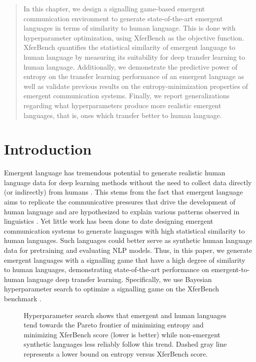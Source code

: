 \begin{abstract}
In this chapter, we design a signalling game-based emergent communication environment to generate state-of-the-art emergent languages in terms of similarity to human language.
This is done with hyperparameter optimization, using XferBench as the objective function.
XferBench quantifies the statistical similarity of emergent language to human language by measuring its suitability for deep transfer learning to human language.
Additionally, we demonstrate the predictive power of entropy on the transfer learning performance of an emergent language as well as validate previous results on the entropy-minimization properties of emergent communication systems.
Finally, we report generalizations regarding what hyperparameters produce more realistic emergent languages, that is, ones which transfer better to human language.
\end{abstract}

\section{Introduction}


Emergent language has tremendous potential to generate realistic human language data for deep learning methods without the need to collect data directly (or indirectly) from humans \citep{boldt2024review}.
This stems from the fact that emergent language aims to replicate the communicative pressures that drive the development of human language and are hypothesized to explain various patterns observed in linguistics \citep{sep-linguistics}.
Yet little work has been done to date designing emergent communication systems to generate languages with high statistical similarity to human languages.
Such languages could better serve as synthetic human language data for pretraining and evaluating NLP models.
Thus, in this paper, we generate emergent languages with a signalling game that have a high degree of similarity to human languages, demonstrating state-of-the-art performance on emergent-to-human language deep transfer learning.
Specifically, we use Bayesian hyperparameter search to optimize a signalling game on the XferBench benchmark \citep{boldt-mortensen-2024-xferbench}.

\begin{figure}
  \centering
  \caption{Hyperparameter search shows that emergent and human languages tend towards the Pareto frontier of minimizing entropy and minimizing XferBench score (lower is better) while non-emergent synthetic languages less reliably follow this trend.  Dashed gray line represents a lower bound on entropy versus XferBench score.}
  \unskip\label{hpo:fig:ent-xb}
\end{figure}

